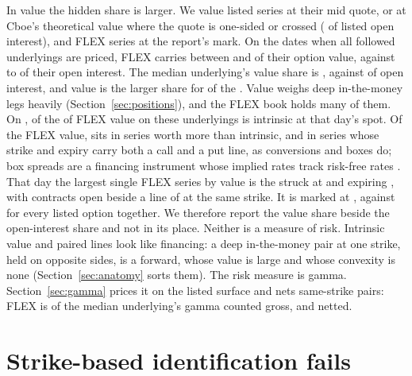 \documentclass[11pt]{article}
\begin{document}
In value the hidden share is larger. We value listed series at their mid quote, or at
Cboe's theoretical value where the quote is one-sided or crossed (\HiddenValueTheo{} of
listed open interest), and FLEX series at the report's mark. On the
\HiddenValueCompleteDates{} dates when all \HiddenValueNames{} followed underlyings are
priced, FLEX carries between \HiddenValueLow{} and \HiddenValueHigh{} of their option
value, against \HiddenValueOpenInterestLow{} to \HiddenValueOpenInterestHigh{} of their
open interest. The median underlying's value share is \HiddenValueMedianName{}, against
\HiddenValueMedianNameOpenInterest{} of open interest, and value is the larger share for
\HiddenValueAbove{} of the \HiddenValueNames{}. Value weighs deep in-the-money legs
heavily (Section~\ref{sec:positions}), and the FLEX book holds many of them. On
\HiddenValueCompositionDate{}, \HiddenValueIntrinsic{} of the \HiddenValueFlexTotal{} of
FLEX value on these underlyings is intrinsic at that day's spot. Of the FLEX value,
\HiddenValueDeep{} sits in series worth more than \HiddenValueDeepThreshold{} intrinsic,
and \HiddenValuePaired{} in series whose strike and expiry carry both a call and a put
line, as conversions and boxes do; box spreads are a financing instrument whose implied
rates track risk-free rates \citep{binsbergen2022}. That day the largest single FLEX
series by value is the \HiddenLineSymbol{} \HiddenLineRight{} struck at
\HiddenLineStrike{} and expiring \HiddenLineExpiry{}, with \HiddenLineOpenInterest{}
contracts open beside a \HiddenLineOpposite{} line of \HiddenLineOppositeOpenInterest{}
at the same strike. It is marked at \HiddenLineValue{}, against \HiddenLineListed{} for
every listed \HiddenLineSymbol{} option together. We therefore report the value share
beside the open-interest share and not in its place. Neither is a measure of risk.
Intrinsic value and paired lines look like financing: a deep in-the-money pair at one
strike, held on opposite sides, is a forward, whose value is large and whose convexity is
none (Section~\ref{sec:anatomy} sorts them). The risk measure
is gamma. Section~\ref{sec:gamma} prices it on the listed surface and nets same-strike
pairs: FLEX is \GammaMedianGross{} of the median underlying's gamma counted gross, and
\GammaMedianNetted{} netted.

\section{Strike-based identification fails}
\label{sec:identification}
\end{document}
